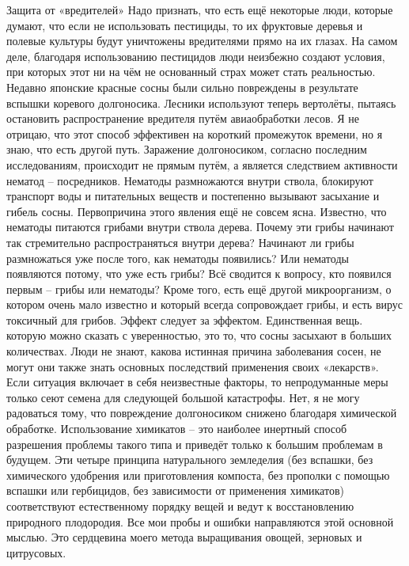 \documentclass[a4paper]{book}
\begin{document}
Защита от «вредителей»
Надо признать, что есть ещё некоторые люди, которые думают, что если не использовать
пестициды, то их фруктовые деревья и полевые культуры будут уничтожены вредителями
прямо на их глазах. На самом деле, благодаря использованию пестицидов люди неизбежно
создают условия, при которых этот ни на чём не основанный страх может стать
реальностью.
Недавно японские красные сосны были сильно повреждены в результате вспышки
коревого долгоносика. Лесники используют теперь вертолёты, пытаясь остановить
распространение вредителя путём авиаобработки лесов. Я не отрицаю, что этот способ
эффективен на короткий промежуток времени, но я знаю, что есть другой путь.
Заражение долгоносиком, согласно последним исследованиям, происходит не прямым
путём, а является следствием активности нематод – посредников. Нематоды размножаются
внутри ствола, блокируют транспорт воды и питательных веществ и постепенно вызывают
засыхание и гибель сосны. Первопричина этого явления ещё не совсем ясна. Известно, что
нематоды питаются грибами внутри ствола дерева. Почему эти грибы начинают так
стремительно распространяться внутри дерева? Начинают ли грибы размножаться уже после
того, как нематоды появились? Или нематоды появляются потому, что уже есть грибы? Всё
сводится к вопросу, кто появился первым – грибы или нематоды?
Кроме того, есть ещё другой микроорганизм, о котором очень мало известно и который
всегда сопровождает грибы, и есть вирус токсичный для грибов. Эффект следует за
эффектом. Единственная вещь. которую можно сказать с уверенностью, это то, что сосны
засыхают в больших количествах.
Люди не знают, какова истинная причина заболевания сосен, не могут они также знать
основных последствий применения своих «лекарств». Если ситуация включает в себя
неизвестные факторы, то непродуманные меры только сеют семена для следующей большой
катастрофы. Нет, я не могу радоваться тому, что повреждение долгоносиком снижено
благодаря химической обработке. Использование химикатов – это наиболее инертный способ
разрешения проблемы такого типа и приведёт только к большим проблемам в будущем.
Эти четыре принципа натурального земледелия (без вспашки, без химического
удобрения или приготовления компоста, без прополки с помощью вспашки или гербицидов,
без зависимости от применения химикатов) соответствуют естественному порядку вещей и
ведут к восстановлению природного плодородия. Все мои пробы и ошибки направляются
этой основной мыслью. Это сердцевина моего метода выращивания овощей, зерновых и
цитрусовых.
\end{document}
